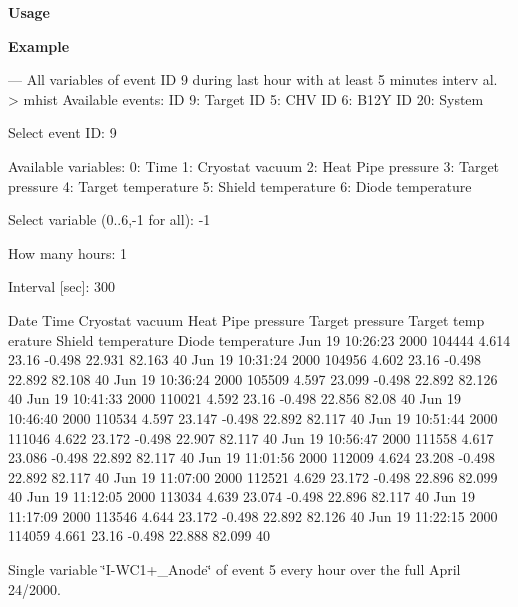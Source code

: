 \begin{DoxyItemize}
\item {\bfseries  Usage }
\item {\bfseries  Example } 
\begin{DoxyCode}
  --- All variables of event ID 9 during last hour with at least 5 minutes interv
      al.
  > mhist
  Available events:
  ID 9: Target
  ID 5: CHV
  ID 6: B12Y
  ID 20: System

  Select event ID: 9

  Available variables:
  0: Time
  1: Cryostat vacuum
  2: Heat Pipe pressure
  3: Target pressure
  4: Target temperature
  5: Shield temperature
  6: Diode temperature

  Select variable (0..6,-1 for all): -1

  How many hours: 1

  Interval [sec]: 300

  Date    Time    Cryostat vacuum Heat Pipe pressure  Target pressure Target temp
      erature      Shield temperature      Diode temperature
  Jun 19 10:26:23 2000    104444  4.614   23.16   -0.498  22.931  82.163  40
  Jun 19 10:31:24 2000    104956  4.602   23.16   -0.498  22.892  82.108  40
  Jun 19 10:36:24 2000    105509  4.597   23.099  -0.498  22.892  82.126  40
  Jun 19 10:41:33 2000    110021  4.592   23.16   -0.498  22.856  82.08   40
  Jun 19 10:46:40 2000    110534  4.597   23.147  -0.498  22.892  82.117  40
  Jun 19 10:51:44 2000    111046  4.622   23.172  -0.498  22.907  82.117  40
  Jun 19 10:56:47 2000    111558  4.617   23.086  -0.498  22.892  82.117  40
  Jun 19 11:01:56 2000    112009  4.624   23.208  -0.498  22.892  82.117  40
  Jun 19 11:07:00 2000    112521  4.629   23.172  -0.498  22.896  82.099  40
  Jun 19 11:12:05 2000    113034  4.639   23.074  -0.498  22.896  82.117  40
  Jun 19 11:17:09 2000    113546  4.644   23.172  -0.498  22.892  82.126  40
  Jun 19 11:22:15 2000    114059  4.661   23.16   -0.498  22.888  82.099  40
\end{DoxyCode}

\end{DoxyItemize}


\begin{DoxyItemize}
\item Single variable \char`\"{}I-\/WC1+\_\-Anode\char`\"{} of event 5 every hour over the full April 24/2000.
\end{DoxyItemize}


